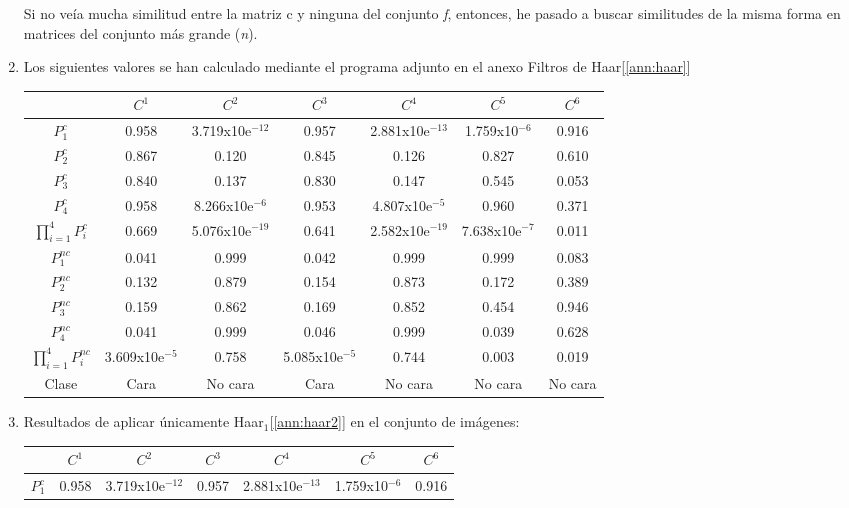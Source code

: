 \documentclass[10pt,a4paper]{article}
\begin{document}
\begin{enumerate}[label=\textbf{\alph*)}]
Si no veía mucha similitud entre la matriz c y ninguna del conjunto \textit{f}, entonces, he pasado a buscar similitudes de la misma forma en matrices del conjunto más grande (\textit{n}).
\item Los siguientes valores se han calculado mediante el programa adjunto en el anexo Filtros de Haar[\ref{ann:haar}]
\begin{center}
\begin{tabular}{|c|c|c|c|c|c|c|}
\hline 
 & $C^{1}$ & $C^{2}$ & $C^{3}$ & $C^{4}$ & $C^{5}$ & $C^{6}$ \\ 
\hline 
 $P^{c}_{1}$ & 0.958 & 3.719x10e$^{-12}$ & 0.957 & 2.881x10e$^{-13}$ & 1.759x10$^{-6}$ & 0.916 \\ 
\hline 
$P^{c}_{2}$ & 0.867 & 0.120 & 0.845 & 0.126 & 0.827 & 0.610 \\ 
\hline 
$P^{c}_{3}$ & 0.840 & 0.137 & 0.830 & 0.147 & 0.545 & 0.053 \\ 
\hline 
$P^{c}_{4}$ & 0.958 & 8.266x10e$^{-6}$ & 0.953 & 4.807x10e$^{-5}$ & 0.960 & 0.371 \\ 
\hline 
$\prod\limits_{i=1}^4 P^{c}_{i}$ & 0.669 & 5.076x10e$^{-19}$ & 0.641 & 2.582x10e$^{-19}$ & 7.638x10e$^{-7}$ & 0.011 \\ 
\hline 
$P^{nc}_{1}$ & 0.041 & 0.999 & 0.042 & 0.999 & 0.999 & 0.083 \\ 
\hline 
$P^{nc}_{2}$ & 0.132 & 0.879 & 0.154 & 0.873 & 0.172 & 0.389 \\ 
\hline 
$P^{nc}_{3}$ & 0.159 & 0.862 & 0.169 & 0.852 & 0.454 & 0.946 \\ 
\hline 
$P^{nc}_{4}$ & 0.041 & 0.999 & 0.046 & 0.999 & 0.039 & 0.628 \\ 
\hline 
$\prod\limits_{i=1}^4 P^{nc}_{i}$ & 3.609x10e$^{-5}$ & 0.758 & 5.085x10e$^{-5}$ & 0.744 & 0.003 & 0.019 \\ 
\hline 
Clase & Cara & No cara & Cara & No cara & No cara & No cara\\ 
\hline 
\end{tabular} 
\end{center}
\item Resultados de aplicar únicamente Haar$_{1}$[\ref{ann:haar2}] en el conjunto de imágenes:
\begin{center}
\begin{tabular}{|c|c|c|c|c|c|c|}
\hline 
 & $C^{1}$ & $C^{2}$ & $C^{3}$ & $C^{4}$ & $C^{5}$ & $C^{6}$ \\ 
\hline 
 $P^{c}_{1}$ & 0.958 & 3.719x10e$^{-12}$ & 0.957 & 2.881x10e$^{-13}$ & 1.759x10$^{-6}$ & 0.916 \\ 

\end{tabular}
\end{center}
\end{enumerate}
\end{document}
